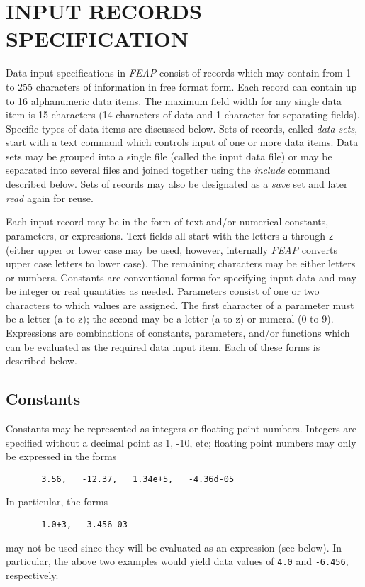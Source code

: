 \chapter[Input Records]{INPUT RECORDS SPECIFICATION}
\label{record}

Data input specifications in {\sl FEAP} consist of records which may contain
from 1 to 255 characters of information in free format form.
Each record can contain up to 16 alphanumeric data items.  The maximum
field width for any single data item is 15 characters (14 characters of
data and 1 character for separating fields).  Specific types of data items
are discussed below.  Sets of records, called {\it data sets},
start with a text command which controls input of one or more 
data items.  Data sets may be grouped into a single file (called the input
data file) or may be separated into several files and joined together
using the {\it include} command described below.  Sets of records may also
be designated as a {\it save} set and later {\it read} again for reuse.

Each input record may be in the form of text and/or numerical
constants, parameters, or expressions.  Text fields all start with the 
letters {\tt a} through {\tt z} (either upper or lower case may be
used, however, internally {\sl FEAP} converts upper case letters to lower case).
The remaining characters may be either letters or numbers.
Constants are conventional
forms for specifying input data and may be integer or real
quantities as needed.  Parameters consist of one or two characters to
which values are assigned.  The first character of a parameter must be
a letter (a to z); the second may be a letter (a to z) or numeral (0 to 9).
Expressions are combinations of
constants, parameters, and/or functions which can be evaluated as the
required data input item.  Each of these forms is described below.

\section{Constants}

Constants may be represented as integers or floating point numbers.
Integers are specified without a decimal point as 1, -10, etc;
floating point numbers may only be expressed in the forms
\begin{verbatim}
       3.56,   -12.37,   1.34e+5,   -4.36d-05
\end{verbatim}
In particular, the forms
\begin{verbatim}
       1.0+3,  -3.456-03
\end{verbatim}
may not be used since they will be evaluated as an expression (see
below).  In particular, the above two examples would yield data values
of {\tt 4.0} and {\tt -6.456}, respectively.

